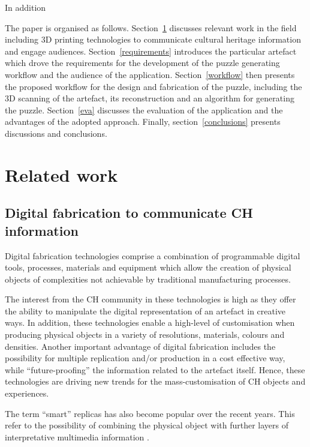 \documentclass[acmlarge,screen,dvipsnames]{acmart}
\begin{document}
In addition

The paper is organised as follows. Section~\ref{related} discusses
relevant work in the field including 3D printing technologies to
communicate cultural heritage information and engage
audiences. Section~\ref{requirements} introduces the particular
artefact which drove the requirements for the development of the
puzzle generating workflow and the audience of the
application. Section~\ref{workflow} then presents the proposed
workflow for the design and fabrication of the puzzle, including the
3D scanning of the artefact, its reconstruction and an algorithm for
generating the puzzle. Section~\ref{eva} discusses the evaluation of
the application and the advantages of the adopted approach. Finally,
section~\ref{conclusions} presents discussions and conclusions.

\section{Related work}
\label{related}

\subsection{Digital fabrication to communicate CH information}

Digital fabrication technologies comprise a combination of
programmable digital tools, processes, materials and equipment which
allow the creation of physical objects of complexities not achievable
by traditional manufacturing processes.

The interest from the CH community in these technologies is high as
they offer the ability to manipulate the digital representation of an
artefact in creative ways. In addition, these technologies enable a
high-level of customisation when producing physical objects in a
variety of resolutions, materials, colours and densities. Another
important advantage of digital fabrication includes the possibility
for multiple replication and/or production in a cost effective way,
while ``future-proofing'' the information related to the artefact
itself. Hence, these technologies are driving new trends for the
mass-customisation of CH objects and experiences.

The term ``smart'' replicas has also become popular over the recent
years. This refer to the possibility of combining the physical object
with further layers of interpretative multimedia information
\cite{Capurro2015,Marshall2016}.
\end{document}
